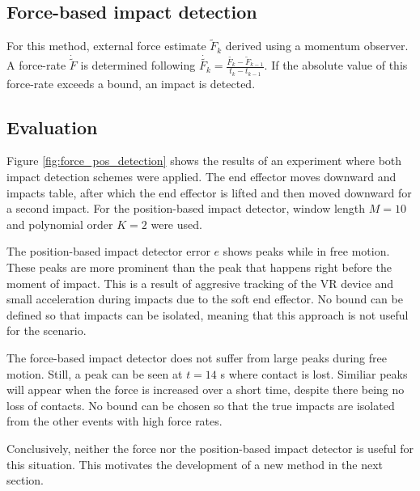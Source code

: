 \documentclass[11pt]{report}
\numberwithin{equation}{section}        %
\numberwithin{figure}{section}          %
\numberwithin{table}{section}           %
\begin{document}
  \subsection{Force-based impact detection}
  For this method, external force estimate $\tilde{F}_k$ derived using a momentum observer. A force-rate $\dot{\tilde{F}}$ is determined following $\dot{\tilde{F_k}}=\frac{\tilde{F_k}-\tilde{F}_{k-1}}{t_k-t_{k-1}}$. If the absolute value of this force-rate exceeds a bound, an impact is detected.

  \subsection{Evaluation}
  Figure \ref{fig:force_pos_detection} shows the results of an experiment where both impact detection schemes were applied. The end effector moves downward and impacts table, after which the end effector is lifted and then moved downward for a second impact. For the position-based impact detector, window length $M=10$ and polynomial order $K=2$ were used. 

  The position-based impact detector error $e$ shows peaks while in free motion. These peaks are more prominent than the peak that happens right before the moment of impact. This is a result of aggresive tracking of the VR device and small acceleration during impacts due to the soft end effector. No bound can be defined so that impacts can be isolated, meaning that this approach is not useful for the scenario.

  The force-based impact detector does not suffer from large peaks during free motion. Still, a peak can be seen at $t=14$ s where contact is lost. Similiar peaks will appear when the force is increased over a short time, despite there being no loss of contacts. No bound can be chosen so that the true impacts are isolated from the other events with high force rates.

  Conclusively, neither the force nor the position-based impact detector is useful for this situation. This motivates the development of a new method in the next section.
\end{document}
